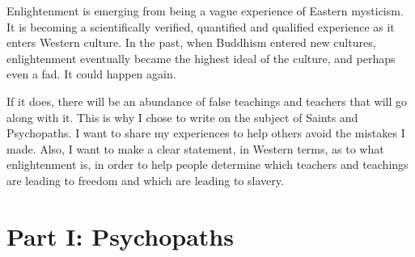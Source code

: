 \documentclass[a5paper,10pt,english]{book}
\begin{document}
\sphinxAtStartPar
Enlightenment is emerging from being a vague experience of Eastern
mysticism. It is becoming a scientifically verified, quantified and
qualified experience as it enters Western culture. In the past, when
Buddhism entered new cultures, enlightenment eventually became the
highest ideal of the culture, and perhaps even a fad. It could happen
again.

\sphinxAtStartPar
If it does, there will be an abundance of false teachings and teachers
that will go along with it. This is why I chose to write on the subject
of Saints and Psychopaths. I want to share my experiences to help others
avoid the mistakes I made. Also, I want to make a clear statement, in
Western terms, as to what enlightenment is, in order to help people
determine which teachers and teachings are leading to freedom and which
are leading to slavery.

\egroup
\mainmatter
\let\subsubsection\subsection
\let\subsection\section
\let\section\chapter
\let\chapter\part

\sphinxstepscope


\chapter{Part I: Psychopaths}
\label{\detokenize{psychopaths:part-i-psychopaths}}\label{\detokenize{psychopaths::doc}}
\end{document}
